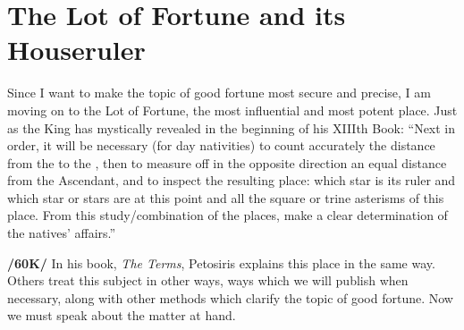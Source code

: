 \section{The Lot of Fortune and its Houseruler}

Since I want to make the topic of good fortune most secure and precise, I am moving on to the Lot of Fortune, the most influential and most potent place. Just as the King has mystically revealed in the beginning of his XIIIth Book: \mnt “Next in order, it will be necessary (for day nativities) to count accurately the distance from the \Sun\xspace to the \Moon, then to measure off in the opposite direction an equal distance from
the Ascendant, and to inspect the resulting place: which star is its ruler and which star or stars are at this point and all the square or trine asterisms of this place. From this study/combination of the places, make a clear determination of the natives’ affairs.”

\textbf{/60K/} In his book, \textit{The Terms}, Petosiris explains this place in the same way. Others treat this subject
in other ways, ways which we will publish when necessary, along with other methods which clarify the topic of good fortune. Now we must speak about the matter at hand.

\newpage